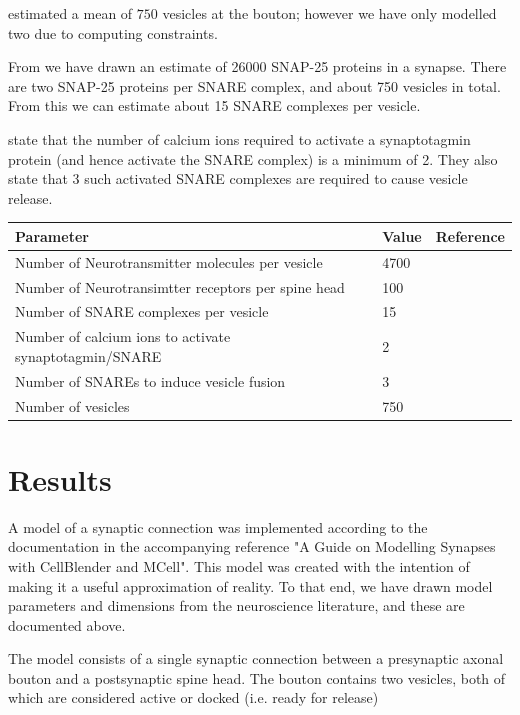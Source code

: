 \documentclass[a4paper]{article}
\begin{document}
\cite{Rollehagen::2015} estimated a mean of $750$ vesicles at the bouton; however we have only modelled two due to computing constraints.

From \cite{Wilhelm:Science:2014} we have drawn an estimate of 26000 SNAP-25 proteins in a synapse. There are two SNAP-25 proteins per SNARE complex, and about 750 vesicles in total. From this we can estimate about 15 SNARE complexes per vesicle. 

\cite{Dittrich:BiophysJ:2013} state that the number of calcium ions required to activate a synaptotagmin protein (and hence activate the SNARE complex) is a minimum of 2. They also state that 3 such activated SNARE complexes are required to cause vesicle release. 

\begin{table}[H]
\begin{tabular}{lll}
Parameter & Value & Reference \\ \hline
Number of Neurotransmitter molecules per vesicle & 4700&\cite{Bruns:Nature:1995} \\
Number of Neurotransimtter receptors per spine head & 100 & \cite{Stricker:JPhysiol:1996} \\
Number of SNARE complexes per vesicle & 15 & \cite{Wilhelm:Science:2014} \\ 
Number of calcium ions to activate synaptotagmin/SNARE & 2 & \cite{Dittrich:BiophysJ:2013} \\
Number of SNAREs to induce vesicle fusion & 3 & \cite{Dittrich:BiophysJ:2013} \\  
Number of vesicles & 750 & \cite{Rollehagen::2015}\\
\end{tabular}
\end{table}

\section{Results}
A model of a synaptic connection was implemented according to the documentation in the accompanying reference "A Guide on Modelling Synapses with CellBlender and MCell". This model was created with the intention of making it a useful approximation of reality. To that end, we have drawn model parameters and dimensions from the neuroscience literature, and these are documented above.

The model consists of a single synaptic connection between a presynaptic axonal bouton and a postsynaptic spine head. The bouton contains two vesicles, both of which are considered active or docked (i.e. ready for release)
\end{document}
